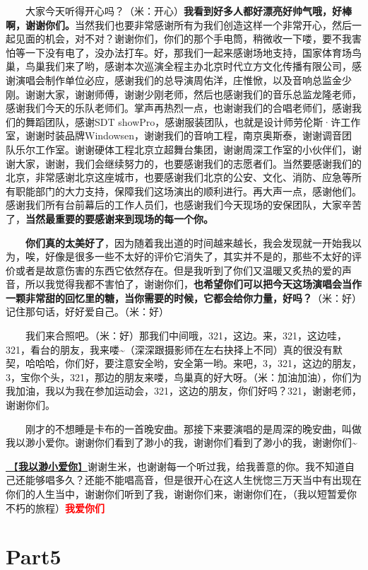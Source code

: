 \documentclass[]{ctexbook}
\begin{document}
  大家今天听得开心吗？（米：开心）\textbf{我看到好多人都好漂亮好帅气哦，好棒啊，谢谢你们。}当然我们也要非常感谢所有为我们创造这样一个非常开心，然后一起见面的机会，对不对？谢谢你们，你们的那个手电筒，稍微收一下喽，要不我害怕等一下没有电了，没办法打车。好，那我们一起来感谢场地支持，国家体育场鸟巢，鸟巢我们来了哟，感谢本次巡演全程主办北京时代立方文化传播有限公司，感谢演唱会制作单位必应，感谢我们的总导演周佑洋，庄惟惞，以及音响总监金少刚。谢谢大家，谢谢师傅，谢谢少刚老师，然后也感谢我们的音乐总监龙隆老师，感谢我们今天的乐队老师们。掌声再热烈一点，也谢谢我们的合唱老师们，感谢我们的舞蹈团队，感谢SDT showPro，感谢服装团队，也就是设计师劳伦斯·许工作室，谢谢时装品牌Windowsen，谢谢我们的音响工程，南京奥斯泰，谢谢调音团队乐尔工作室。谢谢硬体工程北京立超舞台集团，谢谢周深工作室的小伙伴们，谢谢大家，谢谢，我们会继续努力的，也要感谢我们的志愿者们。当然要感谢我们的北京，非常感谢北京这座城市，也要感谢我们北京的公安、文化、消防、应急等所有职能部门的大力支持，保障我们这场演出的顺利进行。再大声一点，感谢他们。感谢我们所有台前幕后的工作人员们，也感谢我们今天现场的安保团队，大家辛苦了，\textbf{当然最重要的要感谢来到现场的每一个你。}

  \textbf{你们真的太美好了}，因为随着我出道的时间越来越长，我会发现就一开始我以为，唉，好像是很多一些不太好的评价它消失了，其实并不是的，那些不太好的评价或者是故意伤害的东西它依然存在。但是我听到了你们又温暖又炙热的爱的声音，所以我觉得我都不害怕了，谢谢你们，\textbf{也希望你们可以把今天这场演唱会当作一颗非常甜的回忆里的糖，当你需要的时候，它都会给你力量，好吗？}（米：好）记住那句话，好好爱自己。（米：好）

  我们来合照吧。（米：好）那我们中间哦，321，这边。来，321，这边哇，321，看台的朋友，我来喽\textasciitilde（深深跟摄影师在左右抉择上不同）真的很没有默契，哈哈哈，你们好，要注意安全哟，安全第一哟。来吧，3，321，这边的朋友，3，宝你个头，321，那边的朋友来喽，鸟巢真的好大呀。（米：加油加油），你们为我加油，我以为我在参加运动会，321，这边的朋友，你们好吗？321，谢谢老师，谢谢你们。

  刚才的不想睡是卡布的一首晚安曲。那接下来要演唱的是周深的晚安曲，叫做我以渺小爱你。谢谢你们看到了渺小的我，谢谢你们看到了渺小的我，谢谢你们\textasciitilde{}

\hyperref[loving-you-in-my-humble-way]{🎵【\textbf{我以渺小爱你}】}谢谢生米，也谢谢每一个听过我，给我善意的你。我不知道自己还能够唱多久？还能不能唱高音，但是很开心在这人生恍惚三万天当中有出现在你们的人生当中，谢谢你们听到了我，谢谢你们来，谢谢你们在，（我以短暂爱你不朽的旅程）\textbf{\textcolor{red}{我爱你们~} }

\section{Part5}\label{beijing-20240921-part5}
\end{document}
